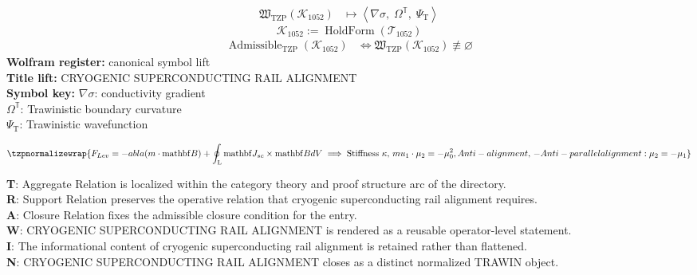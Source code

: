 \noindent
\begin{minipage}[t]{0.48\linewidth}
\begingroup
\small
\[
\begin{aligned}
\mathfrak{W}_{\mathrm{TZP}}\!\left(\mathcal{K}_{1052}\right)
&\longmapsto
\left\langle \nabla\sigma,\; \Omega^{\mathbb{T}},\; \Psi_{\mathrm{T}} \right\rangle
\end{aligned}
\]
\[
\mathcal{K}_{1052}
:=
\operatorname{HoldForm}\!\left(\mathcal{T}_{1052}\right)
\]
\[
\begin{aligned}
\operatorname{Admissible}_{\mathrm{TZP}}\!\left(\mathcal{K}_{1052}\right)
&\Longleftrightarrow
\mathfrak{W}_{\mathrm{TZP}}\!\left(\mathcal{K}_{1052}\right)\not\equiv\varnothing
\end{aligned}
\]
\textbf{Wolfram register:} canonical symbol lift\\
\textbf{Title lift:} CRYOGENIC SUPERCONDUCTING RAIL ALIGNMENT\\
\textbf{Symbol key:} \(\nabla\sigma\): conductivity gradient\\ \(\Omega^{\mathbb{T}}\): Trawinistic boundary curvature\\ \(\Psi_{\mathrm{T}}\): Trawinistic wavefunction
\par
\endgroup
\end{minipage}\hfill
\begin{minipage}[t]{0.48\linewidth}
\[
\tzpnormalizewrap{F_{Lev} = - abla(m \cdot \mathrm{mathbf}{B}) + \oint_{\mathrm{L}} \mathrm{mathbf}{J}_{sc} \times \mathrm{mathbf}{B} dV \implies \text{Stiffness } \kappa,\,mu_1\cdot\mu_2 = -\mu_0^{2}, Anti-alignment,\,- Anti-parallel alignment: \mu_2 = -\mu_1}
\]

\small
\textbf{T}: Aggregate Relation is localized within the category theory and proof structure arc of the directory.\\
\textbf{R}: Support Relation preserves the operative relation that cryogenic superconducting rail alignment requires.\\
\textbf{A}: Closure Relation fixes the admissible closure condition for the entry.\\
\textbf{W}: CRYOGENIC SUPERCONDUCTING RAIL ALIGNMENT is rendered as a reusable operator-level statement.\\
\textbf{I}: The informational content of cryogenic superconducting rail alignment is retained rather than flattened.\\
\textbf{N}: CRYOGENIC SUPERCONDUCTING RAIL ALIGNMENT closes as a distinct normalized TRAWIN object.
\normalsize
\end{minipage}

